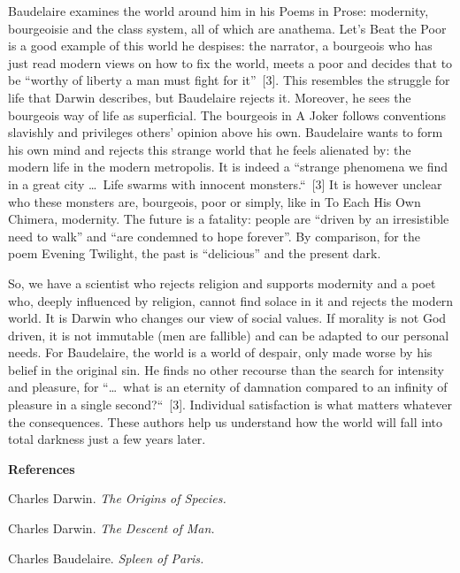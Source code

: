 \begin{multicols}{2}
Baudelaire examines the world around him in his Poems in Prose: modernity, bourgeoisie and the class system, all of which are anathema. Let's Beat the Poor is a
good example of this world he despises: the narrator, a bourgeois who has just read modern views on how to fix the world, meets a poor and decides that to be 
“worthy of liberty a man must fight for it”~[3]. This resembles the struggle for life that Darwin describes, but Baudelaire rejects it. Moreover, he sees the
bourgeois way of life as superficial. The bourgeois in A Joker follows conventions slavishly and privileges others' opinion above his own. Baudelaire wants to form
his own mind and rejects this strange world that he feels alienated by: the modern life in the modern metropolis. It is indeed a “strange phenomena we find in a great
city \dots\ Life swarms with innocent monsters.“~[3] It is however unclear who these monsters are, bourgeois, poor or simply, like in To Each His Own Chimera,
modernity. The future is a fatality: people are “driven by an irresistible need to walk” and “are condemned to hope forever”. By comparison, for the poem Evening
Twilight, the past is “delicious” and the present dark.

So, we have a scientist who rejects religion and supports modernity and a poet who, deeply influenced by religion, cannot find solace in it and rejects the modern
world. It is Darwin who changes our view of social values. If morality is not God driven, it is not immutable (men are fallible) and can be adapted to our personal
needs. For Baudelaire, the world is a world of despair, only made worse by his belief in the original sin. He finds no other recourse than the search for intensity
and pleasure, for “\dots\ what is an eternity of damnation compared to an infinity of pleasure in a single second?“~[3]. Individual satisfaction is what matters
whatever the consequences. These authors help us understand how the world will fall into total darkness just a few years later.

\bigskip

\noindent\textbf{\large References}
\begin{enumerate}[{[1]}]
\item Charles Darwin. \textit{The Origins of Species.}
\item Charles Darwin. \textit{The Descent of Man.}
\item Charles Baudelaire. \textit{Spleen of Paris.}
\end{enumerate}
\end{multicols}

